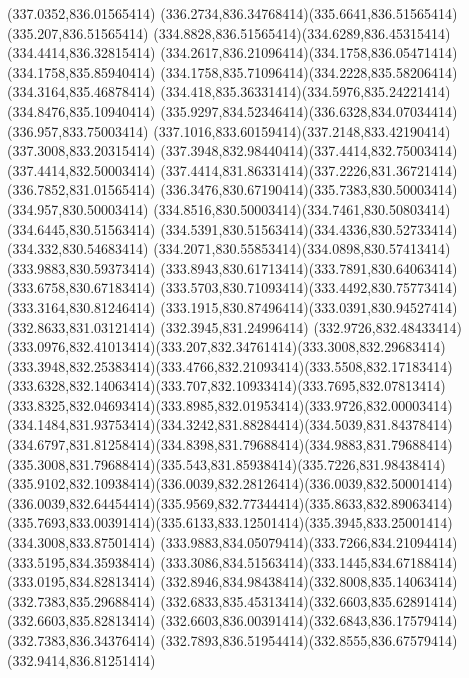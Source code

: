 {{	\moveto(337.0352,836.01565414)
	\curveto(336.2734,836.34768414)(335.6641,836.51565414)(335.207,836.51565414)
	\curveto(334.8828,836.51565414)(334.6289,836.45315414)(334.4414,836.32815414)
	\curveto(334.2617,836.21096414)(334.1758,836.05471414)(334.1758,835.85940414)
	\curveto(334.1758,835.71096414)(334.2228,835.58206414)(334.3164,835.46878414)
	\curveto(334.418,835.36331414)(334.5976,835.24221414)(334.8476,835.10940414)
	\curveto(335.9297,834.52346414)(336.6328,834.07034414)(336.957,833.75003414)
	\curveto(337.1016,833.60159414)(337.2148,833.42190414)(337.3008,833.20315414)
	\curveto(337.3948,832.98440414)(337.4414,832.75003414)(337.4414,832.50003414)
	\curveto(337.4414,831.86331414)(337.2226,831.36721414)(336.7852,831.01565414)
	\curveto(336.3476,830.67190414)(335.7383,830.50003414)(334.957,830.50003414)
	\curveto(334.8516,830.50003414)(334.7461,830.50803414)(334.6445,830.51563414)
	\curveto(334.5391,830.51563414)(334.4336,830.52733414)(334.332,830.54683414)
	\curveto(334.2071,830.55853414)(334.0898,830.57413414)(333.9883,830.59373414)
	\curveto(333.8943,830.61713414)(333.7891,830.64063414)(333.6758,830.67183414)
	\curveto(333.5703,830.71093414)(333.4492,830.75773414)(333.3164,830.81246414)
	\curveto(333.1915,830.87496414)(333.0391,830.94527414)(332.8633,831.03121414)
	\lineto(332.3945,831.24996414)
	\lineto(332.9726,832.48433414)
	\curveto(333.0976,832.41013414)(333.207,832.34761414)(333.3008,832.29683414)
	\curveto(333.3948,832.25383414)(333.4766,832.21093414)(333.5508,832.17183414)
	\curveto(333.6328,832.14063414)(333.707,832.10933414)(333.7695,832.07813414)
	\curveto(333.8325,832.04693414)(333.8985,832.01953414)(333.9726,832.00003414)
	\curveto(334.1484,831.93753414)(334.3242,831.88284414)(334.5039,831.84378414)
	\curveto(334.6797,831.81258414)(334.8398,831.79688414)(334.9883,831.79688414)
	\curveto(335.3008,831.79688414)(335.543,831.85938414)(335.7226,831.98438414)
	\curveto(335.9102,832.10938414)(336.0039,832.28126414)(336.0039,832.50001414)
	\curveto(336.0039,832.64454414)(335.9569,832.77344414)(335.8633,832.89063414)
	\curveto(335.7693,833.00391414)(335.6133,833.12501414)(335.3945,833.25001414)
	\lineto(334.3008,833.87501414)
	\curveto(333.9883,834.05079414)(333.7266,834.21094414)(333.5195,834.35938414)
	\curveto(333.3086,834.51563414)(333.1445,834.67188414)(333.0195,834.82813414)
	\curveto(332.8946,834.98438414)(332.8008,835.14063414)(332.7383,835.29688414)
	\curveto(332.6833,835.45313414)(332.6603,835.62891414)(332.6603,835.82813414)
	\curveto(332.6603,836.00391414)(332.6843,836.17579414)(332.7383,836.34376414)
	\curveto(332.7893,836.51954414)(332.8555,836.67579414)(332.9414,836.81251414)
}}
